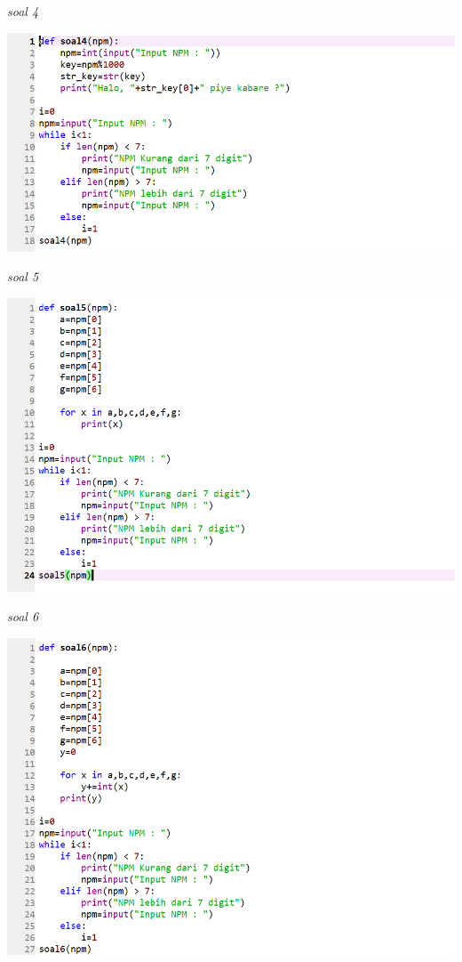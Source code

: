 \documentclass{article}
\begin{document}
\textit{soal 4}
\begin{center}
    \includegraphics[width=15cm\textwidth]{figure/4.png}
\end{center}

\textit{soal 5}
\begin{center}
    \includegraphics[width=15cm\textwidth]{figure/5.png}
\end{center}

\textit{soal 6}
\begin{center}
    \includegraphics[width=15cm\textwidth]{figure/6.png}
\end{center}
\end{document}
